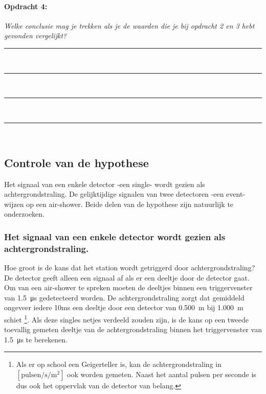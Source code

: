 \bigskip{}


\begin{minipage}[t]{1\columnwidth}%

\paragraph{Opdracht 4:}

\textit{Welke conclusie mag je trekken als je de waarden die je bij
opdracht 2 en 3 hebt gevonden vergelijkt?}

\begin{center}
    \rule{\textwidth}{0.3mm}\\
    \rule{\textwidth}{0.3mm}\\
    \rule{\textwidth}{0.3mm}\\
    \rule{\textwidth}{0.3mm}\\
\end{center}
\end{minipage}


\subsection{Controle van de hypothese}

Het signaal van een enkele detector -een single- wordt gezien als
achtergrondstraling. De gelijktijdige signalen van twee detectoren
-een event- wijzen op een air-shower. Beide delen van de hypothese
zijn natuurlijk te onderzoeken.


\subsubsection{Het signaal van een enkele detector wordt gezien als achtergrondstraling.}

Hoe groot is de kans dat het station wordt getriggerd door achtergrondstraling?
De detector geeft alleen een signaal af als er een deeltje door de
detector gaat. Om van een air-shower te spreken moeten de deeltjes
binnen een triggervenster van \SI{1.5}{\micro\second} gedetecteerd
worden. De achtergrondstraling zorgt dat gemiddeld ongeveer iedere
10ms een deeltje door een detector van \SI{0.500}{\meter} bij \SI{1.000}{\meter}
schiet%
\footnote{Als er op school een Geigerteller is, kan de achtergrondstraling in
$\mathrm{\left[pulsen/s/m^{2}\right]}$ ook worden gemeten. Naast
het aantal pulsen per seconde is dus ook het oppervlak van de detector
van belang.%
}. Als deze singles netjes verdeeld zouden zijn, is de kans op een
tweede toevallig gemeten deeltje van de achtergrondstraling binnen
het triggervenster van \SI{1.5}{\micro\second} te berekenen.

